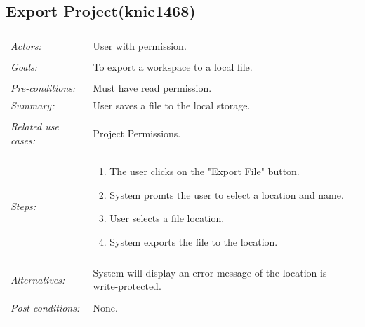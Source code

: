 \documentclass[11pt]{report}
\begin{document}
\subsection{Export Project(knic1468)}
\begin{tabular}{ p{2cm} p{12cm} }
\hline
\\
\textit{Actors:} & User with permission.\\
\\
\textit{Goals:} & To export a workspace to a local file. \\
\\
\textit{Pre-conditions:} & Must have read permission. 
\\
\textit{Summary:} & User saves a file to the local storage. \\
\\
\textit{Related use cases:} & Project Permissions. \\
\\
\textit{Steps:} & \begin{enumerate}
 \item The user clicks on the "Export File" button. 
 \item System promts the user to select a location and name. 
 \item User selects a file location. 
 \item System exports the file to the location. 
 \end{enumerate}\\
 \\
 \textit{Alternatives:} & System will display an error message of the location is write-protected.\\
 \\
 \textit{Post-conditions:} & None. \\
 \\
\hline
\end{tabular}
\end{document}
